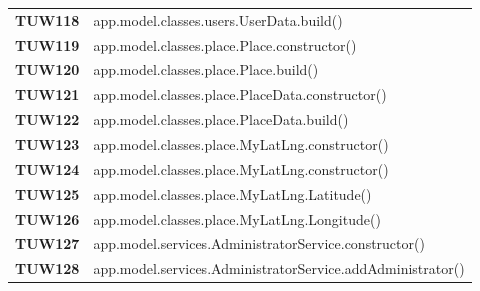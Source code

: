 \documentclass[../../piano-di-qualifica.tex]{subfiles}
\begin{document}
\begin{longtable}[H]{>{\centering\bfseries}m{3cm} >{}m{13cm}}
  TUW118             & app.model.classes.users.UserData.build\@()                                                              \\


  TUW119             & app.model.classes.place.Place.constructor\@()                                                           \\

  TUW120             & app.model.classes.place.Place.build\@()                                                                 \\


  TUW121             & app.model.classes.place.PlaceData.constructor\@()                                                       \\

  TUW122             & app.model.classes.place.PlaceData.build\@()                                                             \\


  TUW123             & app.model.classes.place.MyLatLng.constructor\@()                                                        \\

  TUW124             & app.model.classes.place.MyLatLng.constructor\@()                                                        \\

  TUW125             & app.model.classes.place.MyLatLng.Latitude\@()                                                           \\

  TUW126             & app.model.classes.place.MyLatLng.Longitude\@()                                                          \\


  TUW127             & app.model.services.AdministratorService.constructor\@()                                                 \\

  TUW128             & app.model.services.AdministratorService.addAdministrator\@()                                            \\


\end{longtable}
\end{document}
